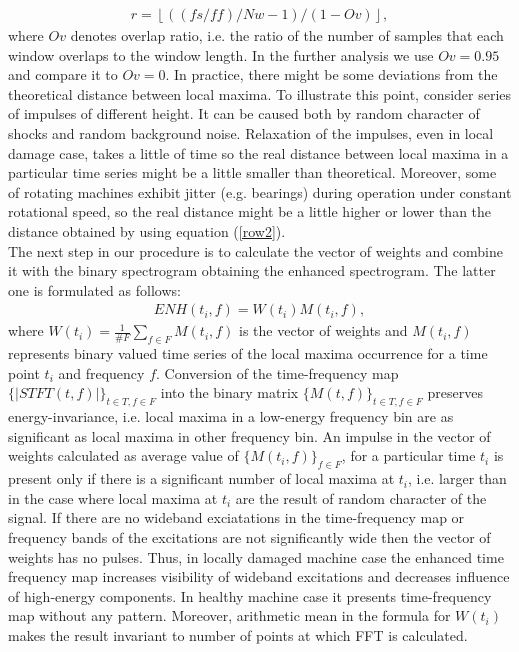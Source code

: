 \documentclass[3p,times]{elsarticle}
\begin{document}
\begin{eqnarray}\label{row2}
r=\left\lfloor ((fs/ff)/Nw-1)/(1-Ov)\right\rfloor,
\end{eqnarray}
where $Ov$ denotes overlap ratio, i.e. the ratio of the number of samples that each window overlaps to the window length. In the further analysis we use $Ov=0.95$ and compare it to $Ov=0$. In practice, there might be some deviations from the theoretical distance between local maxima. To illustrate this point, consider series of impulses of different height. It can be caused both by random character of shocks and random background noise. Relaxation of the impulses, even in local damage case, takes a little of time so the real distance between local maxima in a particular time series might be a little smaller than theoretical. Moreover, some of rotating machines exhibit jitter (e.g. bearings) during operation under constant rotational speed, so the real distance might be a little higher or lower than the distance obtained by using equation (\ref{row2}).\\
The next step in our procedure is to calculate the vector of weights and combine it with the binary spectrogram obtaining the enhanced spectrogram. The latter one is formulated as follows:
\begin{eqnarray}\label{row3}
ENH(t_i,f)=W(t_i)M(t_i,f),
\end{eqnarray}
where $W(t_i)=\frac{1}{\#F}\sum_{f\in F}M(t_i,f)$ is the vector of weights and $M(t_i,f)$  represents binary valued time series of the local maxima occurrence
for a time point  $t_i$ and frequency $f$. Conversion of the time-frequency map $\{|STFT(t,f)|\}_{t\in T, f\in F}$ into the binary matrix $\{M(t,f)\}_{t\in T, f\in F}$ preserves energy-invariance, i.e. local maxima in a low-energy frequency bin are as significant as local maxima in other frequency bin. An impulse in the vector of weights calculated as average value of $\{M(t_i,f)\}_{f\in F}$, for a particular time $t_i$ is present only if there is a significant number of local maxima at $t_i$, i.e. larger than in the case where local maxima at $t_i$ are the result of random character of the signal. If there are no wideband exciatations in the time-frequency map or frequency bands of the excitations are not significantly wide then the vector of weights has no pulses. Thus, in locally damaged machine case the enhanced time frequency map increases visibility of wideband excitations and decreases influence of high-energy components. In healthy machine case it presents time-frequency map without any pattern. Moreover, arithmetic mean in the formula for $W(t_i)$ makes the result invariant to number of points at which FFT is calculated.\\
\end{document}
